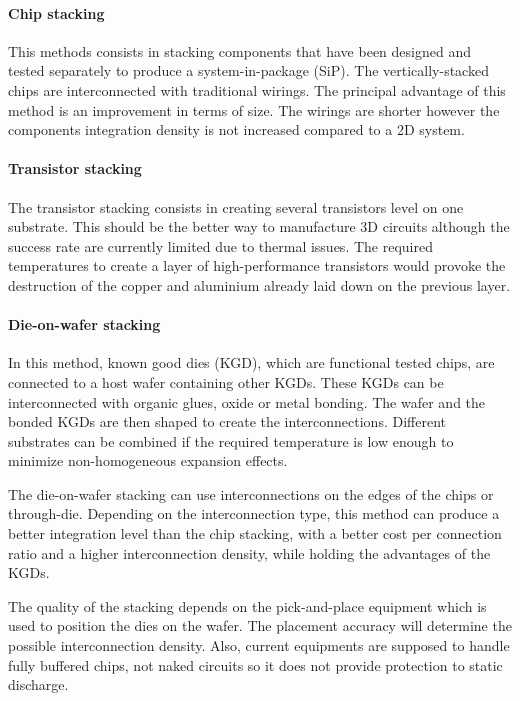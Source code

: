 \paragraph{Chip stacking}

This methods consists in stacking components that have been designed and tested separately to produce a system-in-package (SiP). The vertically-stacked chips are interconnected with traditional wirings. The principal advantage of this method is an improvement in terms of size. The wirings are shorter however the components integration density is not increased compared to a 2D system.

\paragraph{Transistor stacking}

The transistor stacking consists in creating several transistors level on one substrate. This should be the better way to manufacture 3D circuits although the success rate are currently limited due to thermal issues. The required temperatures to create a layer of high-performance transistors would provoke the destruction of the copper and aluminium already laid down on the previous layer.

\paragraph{Die-on-wafer stacking}

In this method, known good dies (KGD), which are functional tested chips, are connected to a host wafer containing other KGDs. These KGDs can be interconnected with organic glues, oxide or metal bonding. The wafer and the bonded KGDs are then shaped to create the interconnections. Different substrates can be combined if the required temperature is low enough to minimize non-homogeneous expansion effects.

The die-on-wafer stacking can use interconnections on the edges of the chips or through-die. Depending on the interconnection type, this method can produce a better integration level than the chip stacking, with a better cost per connection ratio and a higher interconnection density, while holding the advantages of the KGDs.

The quality of the stacking depends on the pick-and-place equipment which is used to position the dies on the wafer. The placement accuracy will determine the possible interconnection density. Also, current equipments are supposed to handle fully buffered chips, not naked circuits so it does not provide protection to static discharge. 

